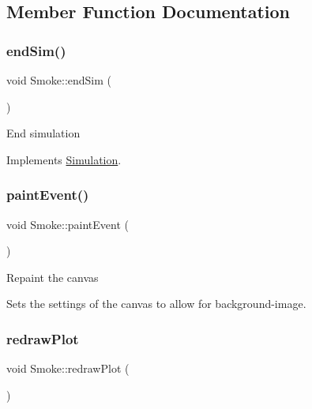 \subsection{Member Function Documentation}
\mbox{\label{classSmoke_a83d3a0d8bf172fcd6bc42ebf07f0f12f}} 
\subsubsection{\texorpdfstring{endSim()}{endSim()}}
{\footnotesize\ttfamily void Smoke\+::end\+Sim (\begin{DoxyParamCaption}{ }\end{DoxyParamCaption})\hspace{0.3cm}{\ttfamily [virtual]}}

End simulation 

Implements \mbox{\hyperlink{classSimulation_ab496d124202f55e741db7db9a304a7ee}{Simulation}}.

\mbox{\label{classSmoke_af00f430e6cbe30b6caf841d7d1b05890}} 
\subsubsection{\texorpdfstring{paintEvent()}{paintEvent()}}
{\footnotesize\ttfamily void Smoke\+::paint\+Event (\begin{DoxyParamCaption}\item[{Q\+Paint\+Event $\ast$}]{ }\end{DoxyParamCaption})}

Repaint the canvas

Sets the settings of the canvas to allow for background-\/image. \mbox{\label{classSmoke_a558447ca2b067daebfca58a2d8b30f66}} 
\subsubsection{\texorpdfstring{redrawPlot}{redrawPlot}}
{\footnotesize\ttfamily void Smoke\+::redraw\+Plot (\begin{DoxyParamCaption}{ }\end{DoxyParamCaption})\hspace{0.3cm}{\ttfamily [slot]}}

